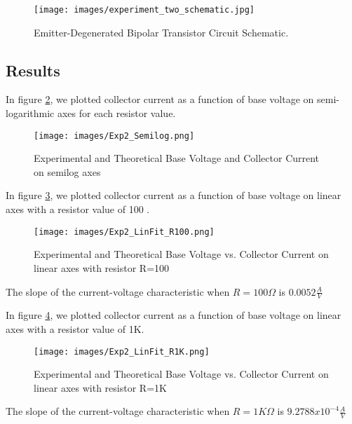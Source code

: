 \documentclass{article}
\begin{document}
\begin{figure}[H] 
  \centering        
  \texttt{[image: images/experiment\_two\_schematic.jpg]}
  \caption{Emitter-Degenerated Bipolar Transistor Circuit Schematic.}   
  \label{fig:exp-2-sch}
\end{figure}

\subsection{Results}

In figure \ref{fig:exp2-semilog}, we plotted collector current as a function of base voltage on semi-logarithmic axes for each resistor value.

\begin{figure}[H]   
  \centering        
  \texttt{[image: images/Exp2\_Semilog.png]}
  \caption{Experimental and Theoretical Base Voltage and Collector Current on semilog axes}   
  \label{fig:exp2-semilog}
\end{figure}

In figure \ref{fig:exp2-linfit-100}, we plotted collector current as a function of base voltage on linear axes with a resistor value of 100 \Omega.

\begin{figure}[H]   
  \centering        
  \texttt{[image: images/Exp2\_LinFit\_R100.png]}
  \caption{Experimental and Theoretical Base Voltage vs. Collector Current on linear axes with resistor R=100 \Omega}   
  \label{fig:exp2-linfit-100}
\end{figure}

The slope of the current-voltage characteristic when $R=100\Omega$ is $0.0052\frac{A}{V}$
\newline

In figure \ref{fig:exp2-linfit-1K}, we plotted collector current as a function of base voltage on linear axes with a resistor value of 1K\Omega.

\begin{figure}[H]   
  \centering        
  \texttt{[image: images/Exp2\_LinFit\_R1K.png]}
  \caption{Experimental and Theoretical Base Voltage vs. Collector Current on linear axes with resistor R=1K \Omega}   
  \label{fig:exp2-linfit-1K}
\end{figure}

The slope of the current-voltage characteristic when $R=1K\Omega$ is $9.2788 x 10^{-4}\frac{A}{V}$
\newline
\end{document}

